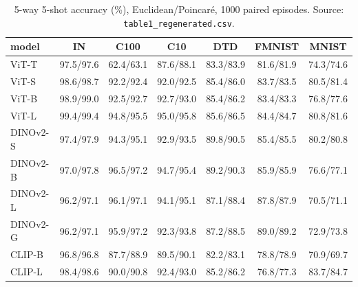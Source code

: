 \begin{table}[H]
\centering
\small
\begin{tabular}{lcccccc}
\toprule
model & IN & C100 & C10 & DTD & FMNIST & MNIST \\
\midrule
ViT-T & 97.5/97.6 & 62.4/63.1 & 87.6/88.1 & 83.3/83.9 & 81.6/81.9 & 74.3/74.6 \\
ViT-S & 98.6/98.7 & 92.2/92.4 & 92.0/92.5 & 85.4/86.0 & 83.7/83.5 & 80.5/81.4 \\
ViT-B & 98.9/99.0 & 92.5/92.7 & 92.7/93.0 & 85.4/86.2 & 83.4/83.3 & 76.8/77.6 \\
ViT-L & 99.4/99.4 & 94.8/95.5 & 95.0/95.8 & 85.6/86.5 & 84.4/84.7 & 80.8/81.6 \\
DINOv2-S & 97.4/97.9 & 94.3/95.1 & 92.9/93.5 & 89.8/90.5 & 85.4/85.5 & 80.2/80.8 \\
DINOv2-B & 97.0/97.8 & 96.5/97.2 & 94.7/95.4 & 89.2/90.3 & 85.9/85.9 & 76.6/77.1 \\
DINOv2-L & 96.2/97.1 & 96.1/97.1 & 94.1/95.1 & 87.1/88.4 & 87.8/87.9 & 70.5/71.1 \\
DINOv2-G & 96.2/97.1 & 95.9/97.2 & 92.3/93.8 & 87.2/88.5 & 89.0/89.2 & 72.9/73.8 \\
CLIP-B & 96.8/96.8 & 87.7/88.9 & 89.5/90.1 & 82.2/83.1 & 78.8/78.9 & 70.9/69.7 \\
CLIP-L & 98.4/98.6 & 90.0/90.8 & 92.4/93.0 & 85.2/86.2 & 76.8/77.3 & 83.7/84.7 \\
\bottomrule
\end{tabular}
\caption{5-way 5-shot accuracy (\%), Euclidean/Poincar\'e, 1000 paired episodes. Source: \texttt{table1\_regenerated.csv}.}
\label{tab:a3}
\end{table}
